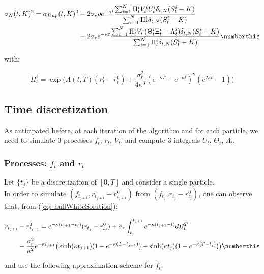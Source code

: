 \begin{align*}
\sigma_N(t,K)^2 = \sigma_{Dup}(t,K)^2 & -2\sigma_r\rho e^{-\kappa t}\frac{\sum_{i=1}^N \Pi_t^{i} V_t^iU_t^i \delta_{t,N}(S_t^i-K) }{\sum_{i=1}^N \Pi_t^{i} \delta_{t,N}(S_t^i-K)} \\
&  -2\sigma_r e^{-\kappa t}\frac{\sum_{i=1}^N \Pi_t^{i}V_t^i(\Theta^i_t\Xi^i_t-\Lambda^i_t)\delta_{t,N}(S_t^i-K) }{\sum_{i=1}^N \Pi_t^{i} \delta_{t,N}(S_t^i-K)} \numberthis \label{eq: discrete_localVolatility_forward_HullWhite}
\end{align*}

with:

$$ \Pi_t^{i} = \exp\bigg( A(t,T)(r_t^i-r_t^0)+\frac{\sigma_r^2}{4\kappa^3}(e^{-\kappa T}-e^{-\kappa t})^2(e^{2\kappa t}-1)     \bigg) $$

\subsection{Time discretization}
As anticipated before, at each iteration of the algorithm and for each particle, we need to simulate 3 processes
$f_t$, $r_t$, $V_t$, and compute 3 integrals $U_t$, $\Theta_t$, $\Lambda_t$.

\subsubsection{Processes: $f_t$ and $r_t$}
Let $\{t_j\}$ be a discretization of $[0,T]$ and consider a single particle.\\
In order to simulate $(f_{t_{j+1}}, r_{t_{j+1}} - r^0_{t_{j+1}})$ from $(f_{t_{j}}, r_{t_{j}} - r^0_{t_{j}})$, one can observe that, from (\ref{eq: hullWhiteSolution}):

\begin{align*}
r_{t_{j+1}}& - r^0_{t_{j+1}}  =  e^{-\kappa(t_{j+1}-t_j) }(r_{t_{j}} - r^0_{t_{j}})+\sigma_r\int_{t_j}^{t_{j+1}}e^{-\kappa(t_{j+1}-t) }dB_t^T \\
& - \frac{\sigma^2_r}{\kappa^2}e^{-\kappa t_{j+1} }\big( \sinh(\kappa t_{j+1})(1-e^{-\kappa(T-t_{j+1}) })-\sinh(\kappa t_{j})(1-e^{-\kappa(T-t_{j}) }) \big) \numberthis \label{eq: discretization_interestRate}
\end{align*}

and use the following approximation scheme for $f_t$:

